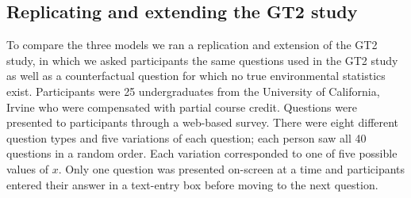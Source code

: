 \subsection*{Replicating and extending the GT2 study}

To compare the three models we ran a replication and extension of the GT2 study, in which we asked participants the same questions used in the GT2 study as well as a counterfactual question for which no true environmental statistics exist. Participants were 25 undergraduates from the University of California, Irvine who were compensated with partial course credit. Questions were presented to participants through a web-based survey. There were eight different question types and five variations of each question; each person saw all 40 questions in a random order. Each variation corresponded to one of five possible values of $x$. Only one question was presented on-screen at a time and participants entered their answer in a text-entry box before moving to the next question.


